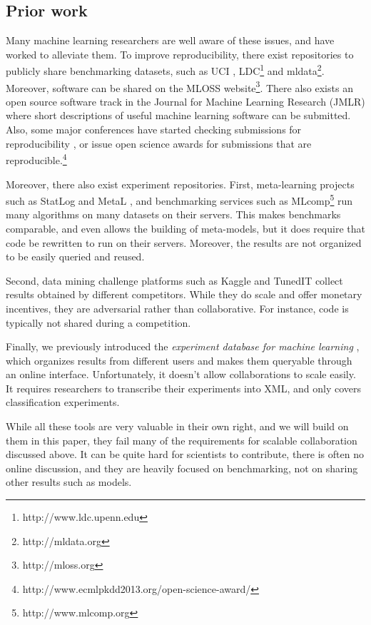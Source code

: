 \documentclass{acmproc-sp}
\begin{document}
\subsection{Prior work}
Many machine learning researchers are well aware of these issues, and have worked to alleviate them. To improve reproducibility, there exist repositories to publicly share benchmarking datasets, such as UCI \cite{Asuncion:2007p519}, LDC\footnote{http://www.ldc.upenn.edu} and mldata\footnote{http://mldata.org}. Moreover, software can be shared on the MLOSS website\footnote{http://mloss.org}. There also exists an open source software track in the Journal for Machine Learning Research (JMLR) where short descriptions of useful machine learning software can be submitted. Also, some major conferences have started checking submissions for reproducibility \cite{Manolescu:2008p18044}, or issue open science awards for submissions that are reproducible.\footnote{http://www.ecmlpkdd2013.org/open-science-award/}

Moreover, there also exist experiment repositories. First, meta-learning projects such as StatLog \cite{Michie:1994p1780} and MetaL \cite{Brazdil:2009p721}, and benchmarking services such as MLcomp\footnote{http://www.mlcomp.org} run many algorithms on many datasets on their servers. This makes benchmarks comparable, and even allows the building of meta-models, but it does require that code be rewritten to run on their servers. Moreover, the results are not organized to be easily queried and reused.

Second, data mining challenge platforms such as Kaggle \cite{Carpenter:2011p34283} and TunedIT \cite{Wojnarski:2010p18714} collect results obtained by different competitors. While they do scale and offer monetary incentives, they are adversarial rather than collaborative. For instance, code is typically not shared during a competition. 

Finally, we previously introduced the \textit{experiment database for machine learning} \cite{Blockeel:2007p66,Vanschoren12}, which organizes results from different users and makes them queryable through an online interface. Unfortunately, it doesn't allow collaborations to scale easily. It requires researchers to transcribe their experiments into XML, and only covers classification experiments. 

While all these tools are very valuable in their own right, and we will build on them in this paper, they fail many of the requirements for scalable collaboration discussed above. It can be quite hard for scientists to contribute, there is often no online discussion, and they are heavily focused on benchmarking, not on sharing other results such as models. 
\end{document}
